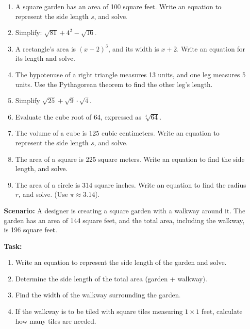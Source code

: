 \documentclass[12pt]{article}
\begin{document}
\begin{tcolorbox}[colframe=black!60, colback=white, 
coltitle=black, colbacktitle=black!15, fonttitle=\bfseries\Large, 
title=Problems, halign title=center, left=10pt, right=10pt, top=10pt, bottom=60pt]
\begin{enumerate}[start=8, itemsep=3em]
    \item A square garden has an area of 100 square feet. Write an equation to represent the side length \(s\), and solve.
    \item Simplify: \( \sqrt{81} + 4^2 - \sqrt{16} \).
    \item A rectangle's area is \((x+2)^3\), and its width is \(x+2\). Write an equation for its length and solve.
    \item The hypotenuse of a right triangle measures 13 units, and one leg measures 5 units. Use the Pythagorean theorem to find the other leg's length.
  
    \item Simplify \( \sqrt{25} + \sqrt{9} \cdot \sqrt{4} \).
    \item Evaluate the cube root of 64, expressed as \(\sqrt[3]{64}\).
    \item The volume of a cube is 125 cubic centimeters. Write an equation to represent the side length \(s\), and solve.
    \item The area of a square is 225 square meters. Write an equation to find the side length, and solve.
    \item The area of a circle is 314 square inches. Write an equation to find the radius \(r\), and solve. (Use \(\pi \approx 3.14\)).
\end{enumerate}
\end{tcolorbox}


\vspace{1em}

\begin{tcolorbox}[colframe=black!60, colback=white, 
coltitle=black, colbacktitle=black!15, fonttitle=\bfseries\Large, 
title=Performance Task: Designing a Garden, halign title=center, left=10pt, right=10pt, top=10pt, bottom=100pt]
\textbf{Scenario:} A designer is creating a square garden with a walkway around it. The garden has an area of 144 square feet, and the total area, including the walkway, is 196 square feet.

\textbf{Task:}
\begin{enumerate}[itemsep=4.5em]
    \item Write an equation to represent the side length of the garden and solve.
    \item Determine the side length of the total area (garden + walkway).
    \item Find the width of the walkway surrounding the garden.
    \item If the walkway is to be tiled with square tiles measuring \(1 \times 1\) feet, calculate how many tiles are needed.
  
\end{enumerate}
\end{tcolorbox}
\end{document}
